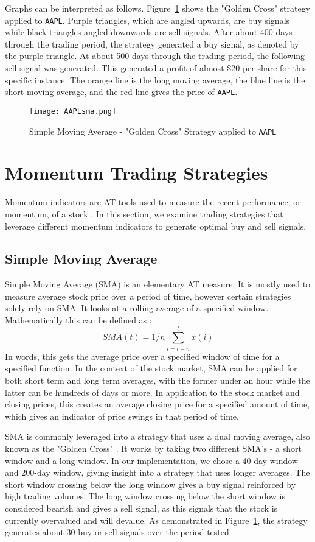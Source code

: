 \documentclass[../thesis.tex]{subfiles}
\begin{document}
Graphs can be interpreted as follows. Figure~\ref{SMAfigure} shows the "Golden Cross" strategy applied to \texttt{AAPL}. Purple triangles, which are angled upwards, are buy signals while black triangles angled downwards are sell signals. After about 400 days through the trading period, the strategy generated a buy signal, as denoted by the purple triangle. At about 500 days through the trading period, the following sell signal was generated. This generated a profit of almost \$20 per share for this specific instance. The orange line is the long moving average, the blue line is the short moving average, and the red line gives the price of \texttt{AAPL}. 

\begin{figure}[h]
\centering
\texttt{[image: AAPLsma.png]}
\caption{Simple Moving Average - "Golden Cross" Strategy applied to \texttt{AAPL} \label{overflow}}
\label{SMAfigure}
\end{figure}


\section{Momentum Trading Strategies}

Momentum indicators are AT tools used to measure the recent performance, or momentum, of a stock \cite{Chong2014}. In this section, we examine trading strategies that leverage different momentum indicators to generate optimal buy and sell signals.

\subsection{Simple Moving Average}
Simple Moving Average (SMA) is an elementary AT measure. It is mostly used to measure average stock price over a period of time, however certain strategies solely rely on SMA. It looks at a rolling average of a specified window. Mathematically this can be defined as \cite{AlmeidaTeixeira}:  \[ SMA(t) = 1/n \sum_{i=t-n}^{t}x(i) \]  In words, this gets the average price over a specified window of time for a specified function. In the context of the stock market, SMA can be applied for both short term and long term averages, with the former under an hour while the latter can be hundreds of days or more. In application to the stock market and closing prices, this creates an average closing price for a specified amount of time, which gives an indicator of price swings in that period of time.

SMA is commonly leveraged into a strategy that uses a dual moving average, also known as the "Golden Cross" \cite{AlmeidaTeixeira}. It works by taking two different SMA's - a short window and a long window. In our implementation, we chose a 40-day window and 200-day window, giving insight into a strategy that uses longer averages. The short window crossing below the long window gives a buy signal reinforced by high trading volumes. The long window crossing below the short window is considered bearish and gives a sell signal, as this signals that the stock is currently overvalued and will devalue. As demonstrated in Figure~\ref{SMAfigure}, the strategy generates about 30 buy or sell signals over the period tested.
\end{document}
